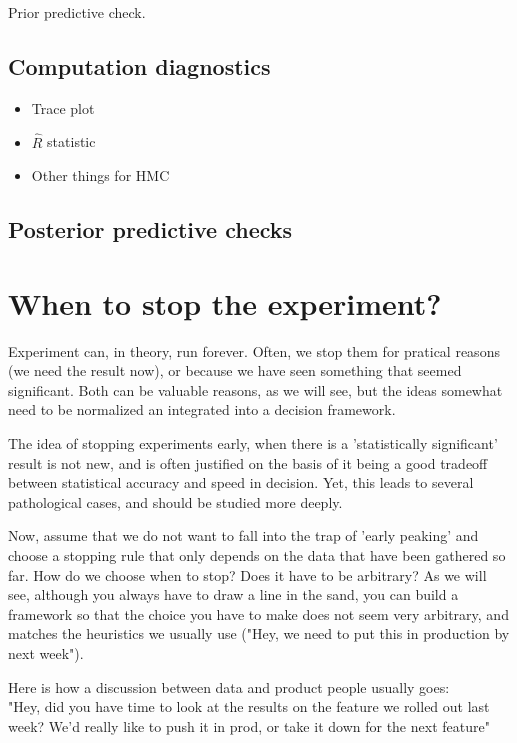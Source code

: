 \documentclass{tufte-book}
\begin{document}
Prior predictive check.~\cite{Betancourt2018}
  
  \subsection{Computation diagnostics}

\begin{itemize}
    \item Trace plot
    \item $\hat{R}$ statistic
    \item Other things for HMC~\cite{Betancourt2017}
\end{itemize}


  \subsection{Posterior predictive checks}


\section{When to stop the experiment?}

Experiment can, in theory, run forever. Often, we stop them for pratical reasons (we need the result now), or
because we have seen something that seemed significant. Both can be valuable reasons, as we will see, but the
ideas somewhat need to be normalized an integrated into a decision framework.

The idea of stopping experiments early, when there is a 'statistically significant' result is not new, and is
often justified on the basis of it being a good tradeoff between statistical accuracy and speed in decision.
Yet, this leads to several pathological cases, and should be studied more deeply.

Now, assume that we do not want to fall into the trap of 'early peaking' and choose a stopping rule that only
depends on the data that have been gathered so far. How do we choose when to stop? Does it have to be
arbitrary? As we will see, although you always have to draw a line in the sand, you can build a framework so
that the choice you have to make does not seem very arbitrary, and matches the heuristics we usually use ("Hey,
we need to put this in production by next week").


Here is how a discussion between data and product people usually goes:\\

"Hey, did you have time to look at the results on the feature we rolled out last week? We'd really like to
push it in prod, or take it down for the next feature"
\end{document}
